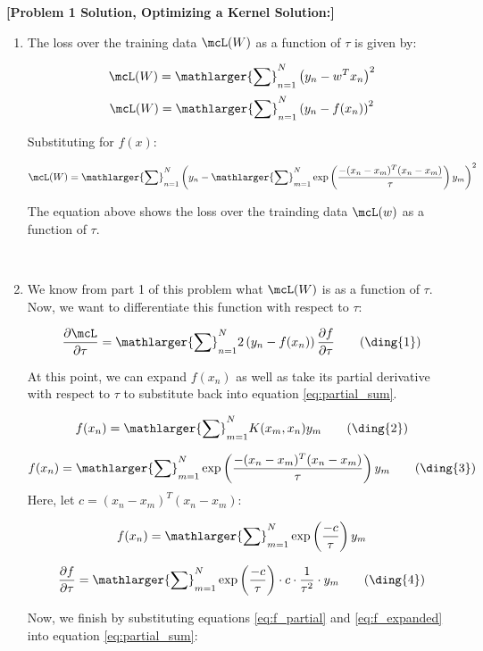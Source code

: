 \documentclass[submit]{harvardml}
\begin{document}
\newpage

\begin{solution}\textbf{[Problem 1 Solution, Optimizing a Kernel Solution:]}

\begin{enumerate}
    \item The loss over the training data $\mcL(W)$ as a function of $\tau$ is given by:
    
    \[\mcL(W) = \mathlarger{\sum}^N_{n=1}\left(y_n-w^Tx_n\right)^2\]
    \[\mcL(W) = \mathlarger{\sum}^N_{n=1}\left(y_n-f(x_n)\right)^2\]
    
    Substituting for $f(x)$:
    
    \[\mcL(W) = \mathlarger{\sum}^N_{n=1}\left(y_n-\mathlarger{\sum}^N_{m=1}\exp\left(\frac{-(x_n-x_m)^T (x_n-x_m)}{\tau} \right)y_m\right)^2\]
    
    The equation above shows the loss over the trainding data $\mcL(w)$ as a function of $\tau$.
    
    \\

    \item We know from part 1 of this problem what $\mcL(W)$ is as a function of $\tau$. Now, we want to differentiate this function with respect to $\tau$:
    
    \[\frac{\partial\mcL}{\partial\tau} = \mathlarger{\sum}^N_{n=1}2\left(y_n-f(x_n)\right)\frac{\partial f}{\partial\tau}
    \label{eq:partial_sum} \tag{\ding{1}}
    \]
    
    At this point, we can expand $f(x_n)$ as well as take its partial derivative with respect to $\tau$ to substitute back into equation \eqref{eq:partial_sum}.
    
    \[f(x_n) = \mathlarger{\sum}^N_{m=1}K(x_m, x_n)y_m
    \label{eq:f} \tag{\ding{2}}
    \]
    
    \[f(x_n) = \mathlarger{\sum}^N_{m=1}\exp\left(\frac{-(x_n-x_m)^T (x_n-x_m)}{\tau} \right)y_m
    \label{eq:f_expanded} \tag{\ding{3}}
    \]
    Here, let $c = (x_n-x_m)^T (x_n-x_m)$:
    
    \[f(x_n) = \mathlarger{\sum}^N_{m=1}\exp\left(\frac{-c}{\tau} \right)y_m
    \]
    
    \[\frac{\partial f}{\partial\tau} = \mathlarger{\sum}^N_{m=1}\exp\left(\frac{-c}{\tau} \right)\cdot c\cdot\frac{1}{\tau^2}\cdot y_m
    \label{eq:f_partial} \tag{\ding{4}}
    \]
    
    Now, we finish by substituting equations \eqref{eq:f_partial} and \eqref{eq:f_expanded} into equation \eqref{eq:partial_sum}:
    

\end{enumerate}
\end{solution}
\end{document}

